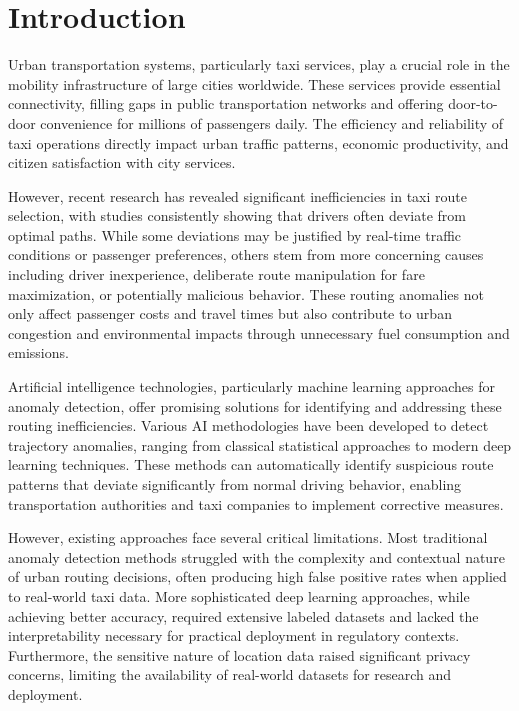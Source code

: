 \documentclass[runningheads]{llncs}
\begin{document}
\newpage

\section{Introduction}
\label{sec:introduction}

Urban transportation systems, particularly taxi services, play a crucial role in the mobility infrastructure of large cities worldwide. These services provide essential connectivity, filling gaps in public transportation networks and offering door-to-door convenience for millions of passengers daily. The efficiency and reliability of taxi operations directly impact urban traffic patterns, economic productivity, and citizen satisfaction with city services.

However, recent research has revealed significant inefficiencies in taxi route selection, with studies consistently showing that drivers often deviate from optimal paths. While some deviations may be justified by real-time traffic conditions or passenger preferences, others stem from more concerning causes including driver inexperience, deliberate route manipulation for fare maximization, or potentially malicious behavior. These routing anomalies not only affect passenger costs and travel times but also contribute to urban congestion and environmental impacts through unnecessary fuel consumption and emissions.

Artificial intelligence technologies, particularly machine learning approaches for anomaly detection, offer promising solutions for identifying and addressing these routing inefficiencies. Various AI methodologies have been developed to detect trajectory anomalies, ranging from classical statistical approaches to modern deep learning techniques. These methods can automatically identify suspicious route patterns that deviate significantly from normal driving behavior, enabling transportation authorities and taxi companies to implement corrective measures.

However, existing approaches face several critical limitations. Most traditional anomaly detection methods struggled with the complexity and contextual nature of urban routing decisions, often producing high false positive rates when applied to real-world taxi data. More sophisticated deep learning approaches, while achieving better accuracy, required extensive labeled datasets and lacked the interpretability necessary for practical deployment in regulatory contexts. Furthermore, the sensitive nature of location data raised significant privacy concerns, limiting the availability of real-world datasets for research and deployment.
\end{document}

